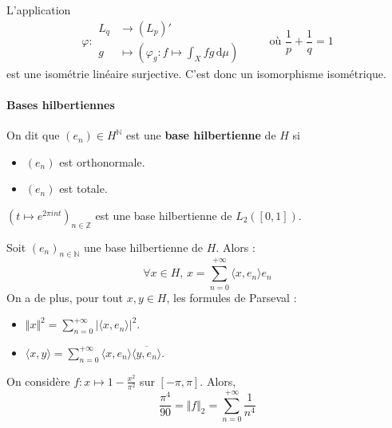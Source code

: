 
  \begin{application}
    L'application
    \[
    \varphi :
    \begin{array}{ll}
      L_q &\rightarrow (L_p)' \\
      g &\mapsto \left( \varphi_g : f \mapsto \int_X f g \, \mathrm{d}\mu \right)
    \end{array}
    \qquad \text{ où } \frac{1}{p} + \frac{1}{q} = 1
    \]
    est une isométrie linéaire surjective. C'est donc un isomorphisme isométrique.
  \end{application}

  \paragraph{Bases hilbertiennes}


  \begin{definition}
    On dit que $(e_n) \in H^{\mathbb{N}}$ est une \textbf{base hilbertienne} de $H$ si
    \begin{itemize}
      \item $(e_n)$ est orthonormale.
      \item $(e_n)$ est totale.
    \end{itemize}
  \end{definition}

  \begin{example}
    $(t \mapsto e^{2\pi int})_{n \in \mathbb{Z}}$ est une base hilbertienne de $L_2([0,1])$.
  \end{example}

  \begin{theorem}
    Soit $(e_n)_{n \in \mathbb{N}}$ une base hilbertienne de $H$. Alors :
    \[ \forall x \in H, \, x = \sum_{n=0}^{+\infty} \langle x, e_n \rangle e_n \]
    On a de plus, pour tout $x, y \in H$, les formules de Parseval :
    \begin{itemize}
      \item $\Vert x \Vert^2 = \sum_{n=0}^{+\infty} \vert \langle x, e_n \rangle \vert^2$.
      \item $\langle x, y \rangle = \sum_{n=0}^{+\infty} \langle x, e_n \rangle \overline{\langle y, e_n \rangle}$.
    \end{itemize}
  \end{theorem}


  \begin{application}
    On considère $f : x \mapsto 1 - \frac{x^2}{\pi^2}$ sur $[-\pi, \pi]$. Alors,
    \[ \frac{\pi^4}{90} = \Vert f \Vert_2 = \sum_{n=0}^{+\infty} \frac{1}{n^4} \]
  \end{application}

